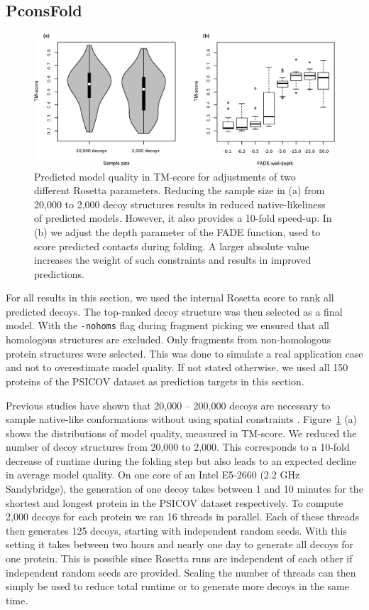 \documentclass{bioinfo}
\begin{document}
\subsection{PconsFold}
\begin{figure}[!tpb]%
\centerline{\includegraphics[scale=0.7]{figures/rosetta.eps}}
\caption{Predicted model quality in TM-score for adjustments of two
  different Rosetta parameters. Reducing the sample size in (a) from
  20,000 to 2,000 decoy structures results in reduced
  native-likeliness of predicted models. However, it also provides a
  10-fold speed-up. In (b) we adjust the depth parameter of the FADE
  function, used to score predicted contacts during folding. A larger
  absolute value increases the weight of such constraints and results
  in improved predictions.}\label{fig:ros} 
\end{figure}
For all results in this section, we used the internal Rosetta score to
rank all predicted decoys. The top-ranked decoy structure was then
selected as a final model. With the {\tt -nohoms} flag during fragment
picking we ensured that all homologous structures are excluded. Only
fragments from non-homologous protein structures were selected. This
was done to simulate a real application case and not to overestimate
model quality. If not stated otherwise, we used all 150 proteins of
the PSICOV dataset as prediction targets in this section. 

Previous studies have shown that 20,000 -- 200,000 decoys are
necessary to sample native-like conformations without using spatial
constraints \cite[]{Simons10526365}. Figure~\ref{fig:ros} (a) shows the distributions of model quality, measured
in TM-score. We reduced the number of decoy structures from 20,000 to
2,000. This corresponds to a 10-fold decrease of runtime during the
folding step but also leads to an expected decline in average model
quality. On one core of an Intel E5-2660 (2.2 GHz Sandybridge), 
the generation of one decoy takes between 1 and 10 minutes for the 
shortest and longest protein in the PSICOV dataset respectively. To 
compute 2,000 decoys for each protein we ran 16 threads in parallel. 
Each of these threads then generates 125 decoys, starting with 
independent random seeds. With this setting it takes between two 
hours and nearly one day to generate all decoys for one protein. 
This is possible since Rosetta runs are independent of each other 
if independent random seeds are provided. Scaling the number of 
threads can then simply be used to reduce total runtime or to 
generate more decoys in the same time. 
\end{document}
